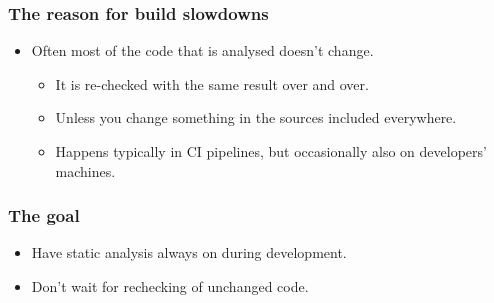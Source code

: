 \documentclass[compress,table,xcolor=table]{beamer}
\begin{document}
\begin{frame}
  \frametitle{The reason for build slowdowns}
    \LARGE
    \begin{itemize}
    \item Often most of the code that is analysed doesn't change.
        \begin{itemize}
        \Large
        \item It is re-checked with the same result over and over.
        \item Unless you change something in the  sources included
            everywhere.
        \item Happens typically in CI pipelines, but occasionally also
            on developers' machines.
        \end{itemize}
    \end{itemize}
\end{frame}
\begin{frame}
  \frametitle{The goal}
    \LARGE
    \begin{itemize}
    \item Have static analysis always on during development.
    \item Don't wait for rechecking of unchanged code.
    \end{itemize}
\end{frame}
\end{document}
